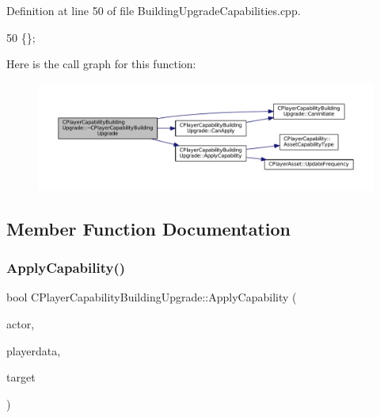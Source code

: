 Definition at line 50 of file Building\+Upgrade\+Capabilities.\+cpp.


\begin{DoxyCode}
50 \{\};
\end{DoxyCode}
Here is the call graph for this function\+:\nopagebreak
\begin{figure}[H]
\begin{center}
\leavevmode
\includegraphics[width=350pt]{classCPlayerCapabilityBuildingUpgrade_abcef586e377c86c3da3cd698dca268ef_cgraph}
\end{center}
\end{figure}


\subsection{Member Function Documentation}
\hypertarget{classCPlayerCapabilityBuildingUpgrade_a5e71446b74307f31ce6d6e9bbfd9a681}{}\label{classCPlayerCapabilityBuildingUpgrade_a5e71446b74307f31ce6d6e9bbfd9a681} 
\subsubsection{\texorpdfstring{Apply\+Capability()}{ApplyCapability()}}
{\footnotesize\ttfamily bool C\+Player\+Capability\+Building\+Upgrade\+::\+Apply\+Capability (\begin{DoxyParamCaption}\item[{std\+::shared\+\_\+ptr$<$ \hyperlink{classCPlayerAsset}{C\+Player\+Asset} $>$}]{actor,  }\item[{std\+::shared\+\_\+ptr$<$ \hyperlink{classCPlayerData}{C\+Player\+Data} $>$}]{playerdata,  }\item[{std\+::shared\+\_\+ptr$<$ \hyperlink{classCPlayerAsset}{C\+Player\+Asset} $>$}]{target }\end{DoxyParamCaption})\hspace{0.3cm}{\ttfamily [virtual]}}



